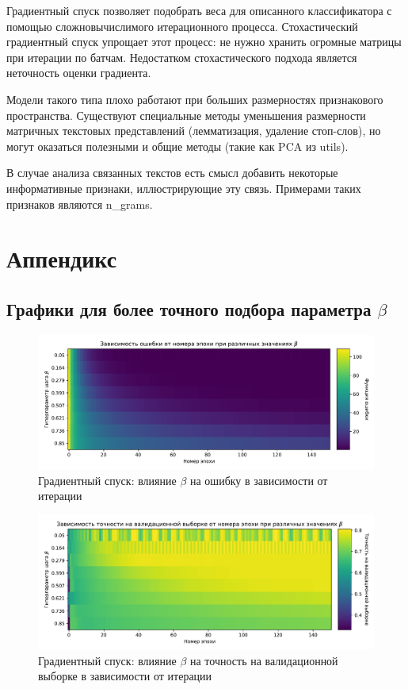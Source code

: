 \documentclass{article}
\begin{document}
            Градиентный спуск позволяет подобрать веса для описанного классификатора с помощью сложновычислимого итерационного процесса. Стохастический градиентный спуск упрощает этот процесс: не нужно хранить огромные матрицы при итерации по батчам. Недостатком стохастического подхода является неточность оценки градиента.

            Модели такого типа плохо работают при больших размерностях признакового пространства. Существуют специальные методы уменьшения размерности матричных текстовых представлений (лемматизация, удаление стоп-слов), но могут оказаться полезными и общие методы (такие как PCA из utils).

            В случае анализа связанных текстов есть смысл добавить некоторые информативные признаки, иллюстрирующие эту связь. Примерами таких признаков являются n\_grams.

    \section{Аппендикс}
        \subsection{Графики для более точного подбора параметра $\beta$}
            \begin{figure}[H]
                \centering
                \includegraphics[width=0.8\linewidth]{./pictures/GDbetas_func2.pdf}
                \caption{Градиентный спуск: влияние $\beta$ на ошибку в зависимости от итерации}
                \label{fig:11}
            \end{figure}
            \begin{figure}[H]
                \centering
                \includegraphics[width=0.8\linewidth]{./pictures/GDbetas_val_accuracy2.pdf}
                \caption{Градиентный спуск: влияние $\beta$ на точность на валидационной выборке в зависимости от итерации}
                \label{fig:12}
            \end{figure}


                
\end{document}
